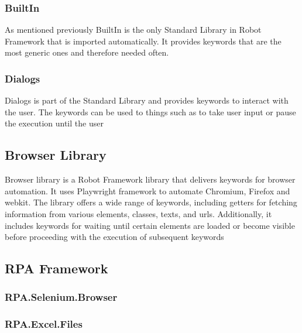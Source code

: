 \subsubsection{BuiltIn}
As mentioned previously BuiltIn is the only Standard Library in Robot Framework that is imported automatically.
It provides keywords that are the most generic ones and therefore needed often.
\subsubsection{Dialogs}
Dialogs is part of the Standard Library and provides keywords to interact with the user. The keywords can be used to things such as to take user input or pause the execution until the user 
\subsection{Browser Library}
Browser library is a Robot Framework library that delivers keywords for browser automation.
It uses Playwright framework to automate Chromium, Firefox and webkit.
The library offers a wide range of keywords, including getters for fetching information from various elements, classes, texts, and \gls{url}s.
Additionally, it includes keywords for waiting until certain elements are loaded or become visible before proceeding with the execution of subsequent keywords
\subsection{RPA Framework}
\subsubsection{RPA.Selenium.Browser}
\subsubsection{RPA.Excel.Files}

\cite{robot-framework:standard-library}
\cite{robot_framework:builtin_library}
\cite{robot_framework:dialogs_library}
\cite{robot_framework:browser_library}
\clearpage %
